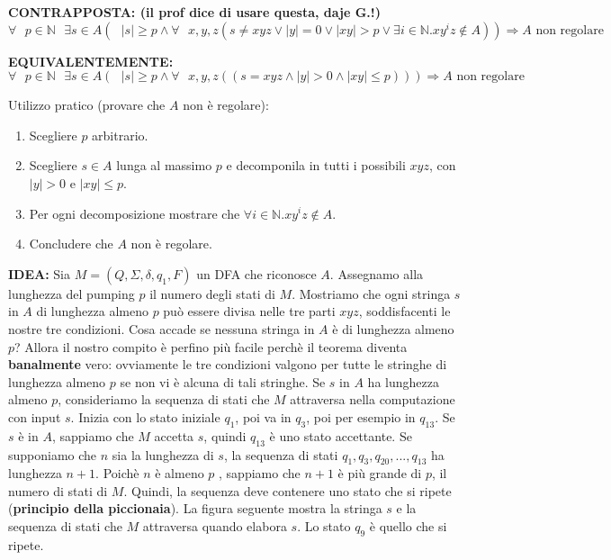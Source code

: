 \documentclass{article}
\begin{document}
\textbf{CONTRAPPOSTA: (il prof dice di usare questa, daje G.!)}
$$
\forall\text{ }p \in \mathbb{N}\text{ }\exists s\in A(\text{ }|s| \geq p \wedge \forall \text{ }x,y,z (s \neq xyz \vee |y| = 0 \vee |xy| > p \vee \exists i\in \mathbb{N}.xy^{i}z \notin A)) \Rightarrow A \text{ non regolare}
$$
\vspace{1em}

\textbf{EQUIVALENTEMENTE:}
$$
\forall\text{ }p \in \mathbb{N}\text{ }\exists s\in A(\text{ }|s| \geq p \wedge \forall \text{ }x,y,z ((s = xyz \wedge |y| > 0 \wedge |xy| \leq p))) \Rightarrow A \text{ non regolare}
$$
\vspace{1em}

Utilizzo pratico (provare che $A$ non è regolare):
\begin{enumerate}
    \item Scegliere $p$ arbitrario.
    \item Scegliere $s \in A$ lunga al massimo $p$ e decomponila in tutti i possibili $xyz$, con $|y| > 0$ e $|xy| \leq p$.
    \item Per ogni decomposizione mostrare che $\forall i\in \mathbb{N}.xy^{i}z \notin A$.
    \item Concludere che $A$ non è regolare.
\end{enumerate}
\vspace{1em}

\textbf{IDEA:}
Sia $M = (Q,\Sigma,\delta,q_{1},F)$ un DFA che riconosce $A$. Assegnamo alla lunghezza del pumping $p$ il numero degli stati di $M$. Mostriamo che ogni stringa $s$ in $A$ di lunghezza almeno $p$ può essere divisa nelle tre parti $xyz$, soddisfacenti le nostre tre condizioni. Cosa accade se nessuna stringa in $A$ è di lunghezza almeno $p$? Allora il nostro compito è perfino più facile perchè il teorema diventa \textbf{banalmente} vero: ovviamente le tre condizioni valgono per tutte le stringhe di lunghezza almeno $p$ se non vi è alcuna di tali stringhe.
Se $s$ in $A$ ha lunghezza almeno $p$, consideriamo la sequenza di stati che $M$ attraversa nella computazione con input $s$. Inizia con lo stato iniziale $q_{1}$, poi va in $q_{3}$, poi per esempio in $q_{13}$. Se $s$ è in $A$, sappiamo che $M$ accetta $s$, quindi $q_{13}$ è uno stato accettante.
Se supponiamo che $n$ sia la lunghezza di $s$, la sequenza di stati $q_{1},q_{3},q_{20},...,q_{13}$ ha lunghezza $n+1$. Poichè $n$ è almeno $p$ , sappiamo che $n+1$ è più grande di $p$, il numero di stati di $M$. Quindi, la sequenza deve contenere uno stato che si ripete (\textbf{principio della piccionaia}).
La figura seguente mostra la stringa $s$ e la sequenza di stati che $M$ attraversa quando elabora $s$. Lo stato $q_{9}$ è quello che si ripete.
\end{document}
